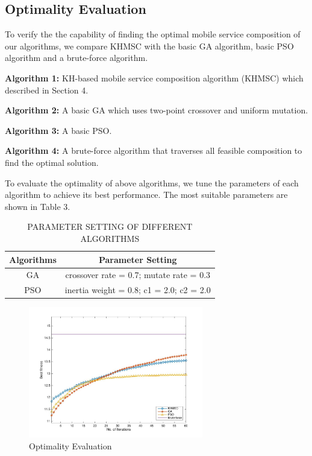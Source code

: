 \documentclass[10pt,journal,compsoc]{IEEEtran}
\begin{document}
\subsection{Optimality Evaluation}
To verify the the capability of finding the optimal mobile service composition of our algorithms, we compare KHMSC with the basic GA algorithm, basic PSO algorithm and a brute-force algorithm.

\textbf{Algorithm 1:} KH-based mobile service composition algorithm (KHMSC) which described in Section 4.

\textbf{Algorithm 2:} A basic GA which uses two-point crossover and uniform mutation.

\textbf{Algorithm 3:} A basic PSO.

\textbf{Algorithm 4:} A brute-force algorithm that traverses all feasible composition to find the optimal solution.

To evaluate the optimality of above algorithms, we tune the parameters of each algorithm to achieve its best performance. The most suitable parameters are shown in Table 3.

\begin{table}[!t]
\renewcommand{\arraystretch}{1.3}
\caption{PARAMETER SETTING OF DIFFERENT ALGORITHMS}
\label{table_example}
\centering
\begin{tabular}{cc}
\hline
\bfseries Algorithms & \bfseries Parameter Setting \\
\hline
GA  & crossover rate = 0.7; mutate rate = 0.3 \\
PSO & inertia weight = 0.8; c1 = 2.0; c2 = 2.0 \\
\hline
\end{tabular}
\end{table}

\begin{figure}[!t]
\centering
\includegraphics[width=3in]{./img/pic10.jpg}
\caption{Optimality Evaluation}
\label{fig_oe}
\end{figure}
\end{document}
